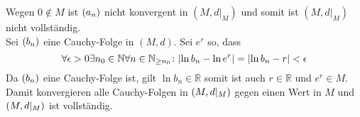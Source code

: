 \documentclass{article}
\begin{document}
\begin{enumerate}[(i)]
  Wegen $0 \notin M$ ist $\qty(a_n)$ nicht konvergent in $(M, d|_M)$ und somit ist $(M, d|_M)$
  nicht vollständig. \\

  Sei $\qty(b_n)$ eine Cauchy-Folge in $(M, d)$.
  Sei $e^r$ so, dass
  \[
    \forall \epsilon > 0 \exists n_0 \in \mathbb{N} \forall n \in \mathbb{N}_{\geq n_0} \colon
    \abs{\ln b_n - \ln e^r} = \abs{\ln b_n - r} < \epsilon
  \]
  Da $\qty(b_n)$ eine Cauchy-Folge ist, gilt $\ln b_n \in \mathbb{R}$ somit ist auch $r \in \mathbb{R}$
  und $e^r \in M$.
  Damit konvergieren alle Cauchy-Folgen in $\qty(M, d|_M)$ gegen einen Wert in $M$ und $\qty(M, d|_M)$
  ist vollständig.

\end{enumerate}
\end{document}
